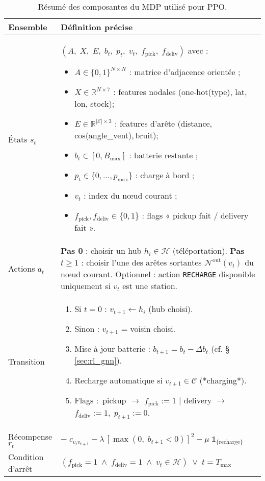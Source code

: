 \documentclass[11pt,a4paper]{article}
\begin{document}
\begin{table}[h]
\centering\small
\begin{tabular}{@{}p{3cm}p{11cm}@{}}
\toprule
\textbf{Ensemble} & \textbf{Définition précise} \\
\midrule
États $s_t$ &
$(A,\;X,\;E,\;b_t,\;p_t,\;v_t,\;f_{\text{pick}},\;f_{\text{deliv}})$ avec :
\begin{itemize}\setlength\itemsep{2pt}
  \item $A\!\in\!\{0,1\}^{N\times N}$ : matrice d'adjacence orientée ;
  \item $X\!\in\!\mathbb{R}^{N\times7}$ : features nodales 
        \small(one-hot(type), lat, lon, stock)\normalsize ;
  \item $E\!\in\!\mathbb{R}^{|\mathcal{E}|\times3}$ : features d'arête 
        \small(distance,\,cos(angle\_vent),\,bruit)\normalsize ;
  \item $b_t\!\in\![0,B_{\max}]$ : batterie restante ;
  \item $p_t\!\in\!\{0,\dots,p_{\max}\}$ : charge à bord ;
  \item $v_t$ : index du nœud courant ;
  \item $f_{\text{pick}},f_{\text{deliv}}\!\in\!\{0,1\}$ : flags « pickup fait / delivery fait ».
\end{itemize}\\
\addlinespace
Actions $a_t$ &
\textbf{Pas 0} : choisir un hub $h_i\in\mathcal{H}$ (téléportation).  
\textbf{Pas $t\ge1$} : choisir l'une des arêtes sortantes 
$\mathcal{N}^{\text{out}}(v_t)$ du nœud courant.  
Optionnel : action \texttt{RECHARGE} disponible uniquement si $v_t$ est une station.\\
\addlinespace
Transition &
\begin{enumerate}\setlength\itemsep{2pt}
  \item Si $t=0$ : $v_{t+1}\!\gets\!h_i$ (hub choisi).  
  \item Sinon : $v_{t+1}$ = voisin choisi.  
  \item Mise à jour batterie : $b_{t+1}\!=\!b_t-\Delta b_t$ (cf. §\,\ref{sec:rl_gnn}).  
  \item Recharge automatique si $v_{t+1}\in\mathcal{C}$ (*charging*).  
  \item Flags : \,pickup $\rightarrow$ $f_{\text{pick}}{:=}1$ \;| delivery $\rightarrow$ $f_{\text{deliv}}{:=}1,\;p_{t+1}{:=}0$.
\end{enumerate}\\
\addlinespace
Récompense $r_t$ &
$-\;c_{v_t v_{t+1}}
-\lambda\,[\max(0,\;b_{t+1}{<}0)]^{2}
-\mu\;\mathbb{1}_{\{\text{recharge}\}}$ \\
\addlinespace
Condition d'arrêt &
\(
(f_{\text{pick}}{=}1\;\land\;f_{\text{deliv}}{=}1\;\land\;v_t\in\mathcal{H})\;\lor\;t=T_{\max}
\)\\
\bottomrule
\end{tabular}
\caption{Résumé des composantes du MDP utilisé pour PPO.}
\end{table}
\end{document}
